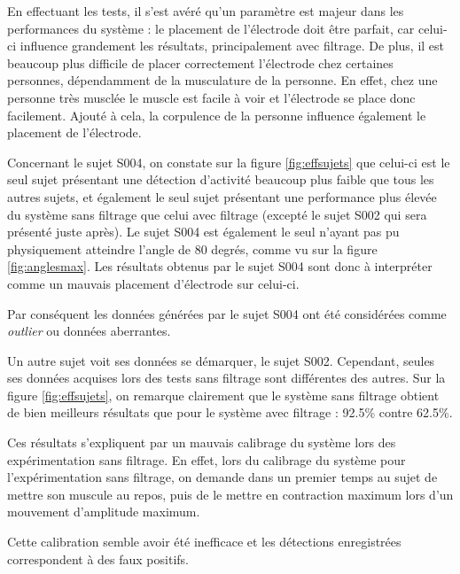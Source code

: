\documentclass[letterpaper, twoside, 12pt, memoire, creativecommons, hyperref]{thETS}
\begin{document}
En effectuant les tests, il s'est avéré qu'un paramètre est majeur dans les performances du système : le placement de l'électrode doit être parfait, car celui-ci influence grandement les résultats, principalement avec filtrage. De plus, il est beaucoup plus difficile de placer correctement l'électrode chez certaines personnes, dépendamment  de la musculature de la personne. En effet, chez une personne très musclée le muscle est facile à voir et l'électrode se place donc facilement. Ajouté à cela, la corpulence de la personne influence également le placement de l'électrode. 

Concernant le sujet S004, on constate sur la figure \ref{fig:effsujets} que celui-ci est le seul sujet présentant une détection d'activité beaucoup plus faible que tous les autres sujets, et également le seul sujet présentant une performance plus élevée du système sans filtrage que celui avec filtrage (excepté le sujet S002 qui sera présenté juste après). Le sujet S004 est également le seul n'ayant pas pu physiquement atteindre l'angle de 80 degrés, comme vu sur la figure \ref{fig:anglesmax}. Les résultats obtenus par le sujet S004 sont donc à interpréter comme un mauvais placement d'électrode sur celui-ci. 

Par conséquent les données générées par le sujet S004 ont été considérées comme \textit{outlier} ou données aberrantes.

Un autre sujet voit ses données se démarquer, le sujet S002. Cependant, seules ses données acquises lors des tests sans filtrage sont différentes des autres. Sur la figure \ref{fig:effsujets}, on remarque clairement que le système sans filtrage obtient de bien meilleurs résultats que pour le système avec filtrage : 92.5\% contre 62.5\%. 

Ces résultats s'expliquent par un mauvais calibrage du système lors des expérimentation sans filtrage. En effet, lors du calibrage du système pour l'expérimentation sans filtrage, on demande dans un premier temps au sujet de mettre son muscule au repos, puis de le mettre en contraction maximum lors d'un mouvement d'amplitude maximum. 

Cette calibration semble avoir été inefficace et les détections enregistrées correspondent à des faux positifs. 

\end{document}
